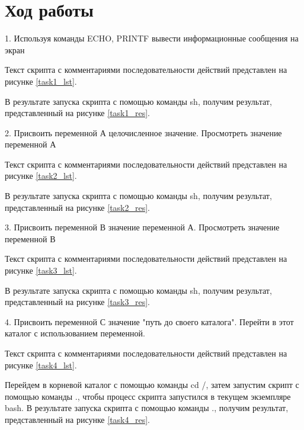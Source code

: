 \section{Ход работы}

1. Используя  команды ECHO, PRINTF вывести  информационные сообщения на экран

Текст скрипта с комментариями последовательности действий представлен на рисунке \ref{task1_lst}.


В результате запуска скрипта с помощью команды sh, получим результат, представленный на рисунке \ref{task1_res}.


2. Присвоить  переменной  А  целочисленное  значение.  Просмотреть значение переменной А

Текст скрипта с комментариями последовательности действий представлен на рисунке \ref{task2_lst}.


В результате запуска скрипта с помощью команды sh, получим результат, представленный на рисунке \ref{task2_res}.


3. Присвоить  переменной  В  значение  переменной  А.  Просмотреть значение переменной В

Текст скрипта с комментариями последовательности действий представлен на рисунке \ref{task3_lst}.


В результате запуска скрипта с помощью команды sh, получим результат, представленный на рисунке \ref{task3_res}.


4. Присвоить переменной С значение "путь до своего каталога". Перейти в этот каталог с использованием переменной.

Текст скрипта с комментариями последовательности действий представлен на рисунке \ref{task4_lst}.


Перейдем в корневой каталог с помощью команды cd /, затем запустим скрипт с помощью команды ., чтобы процесс скрипта запустился в текущем экземпляре bash. В результате запуска скрипта с помощью команды ., получим результат, представленный на рисунке \ref{task4_res}.

